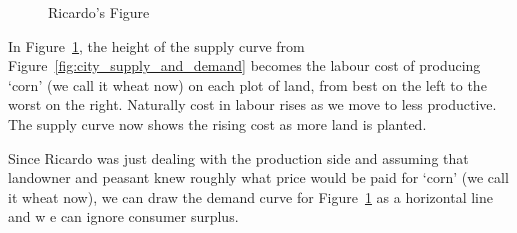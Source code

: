  
\begin{figure}[htbp]
\begin{center}

\caption{Ricardo's Figure}
\label{Fig:Ricardo'sFigure}
\end{center}
\end{figure}


 In Figure~\ref{Fig:Ricardo'sFigure}, the height of the supply curve from Figure~\ref{fig:city_supply_and_demand}   becomes the labour cost of producing  `corn' (we call it wheat now) on each plot of land, from best on the left to the worst on the right. Naturally cost in labour rises as we move to less productive. The supply curve now shows the rising cost as more land is planted.
 
 Since Ricardo was  just dealing with the production side and assuming that landowner and peasant knew roughly what  price would be paid for `corn' (we call it wheat now), we can  draw the demand curve for  Figure~\ref{Fig:Ricardo'sFigure} as a horizontal line and w e can ignore consumer surplus.

